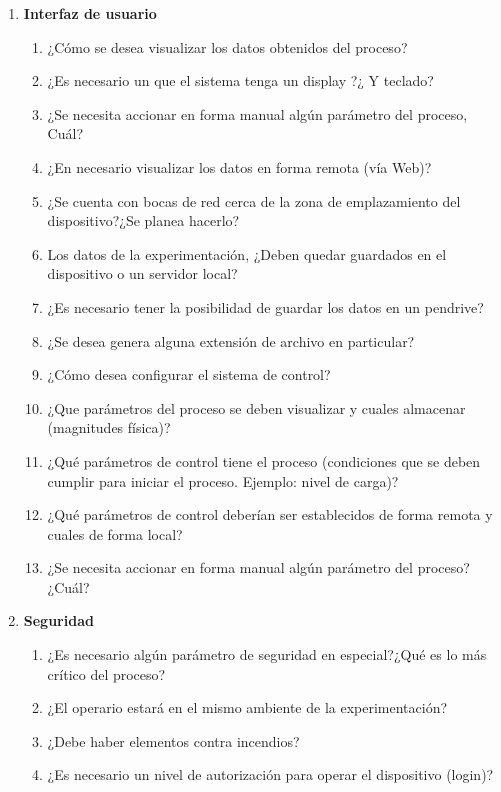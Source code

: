 \documentclass[12pt]{article}
\begin{document}
\begin{enumerate}
      \item \textbf{ Interfaz de usuario }
	\begin{enumerate}
	  \item ¿Cómo se desea visualizar los datos obtenidos del proceso?
	  \item ¿Es necesario un que el sistema tenga un display ?¿ Y teclado?
	  \item ¿Se necesita accionar en forma manual algún parámetro del proceso, Cuál?
	  \item ¿En necesario visualizar los datos en forma remota (vía Web)?
	  \item ¿Se cuenta con bocas de red cerca de la zona de emplazamiento del dispositivo?¿Se planea hacerlo?	  
	  \item Los datos de la experimentación, ¿Deben quedar guardados en el dispositivo o un servidor local?
	  \item ¿Es necesario tener la posibilidad de guardar los datos en un pendrive?	  
	  \item ¿Se desea genera alguna extensión de archivo en particular?
	  \item ¿Cómo desea configurar el sistema de control?
	  \item ¿Que parámetros del proceso se deben visualizar y cuales almacenar (magnitudes física)?
	  \item ¿Qué parámetros de control tiene el proceso (condiciones que se deben cumplir para iniciar el proceso. Ejemplo: nivel de carga)?
	  \item ¿Qué parámetros de control deberían ser establecidos de forma remota y cuales de forma local?
	  \item ¿Se necesita accionar en forma manual algún parámetro del proceso?¿Cuál?
	\end{enumerate}
      
      \item \textbf{ Seguridad }
	\begin{enumerate}
	  \item ¿Es necesario algún parámetro de seguridad en especial?¿Qué es lo más crítico del proceso?
	  \item ¿El operario estará en el mismo ambiente de la experimentación?
	  \item ¿Debe haber elementos contra incendios?
	  \item ¿Es necesario un nivel de autorización para operar el dispositivo (login)?
	\end{enumerate}
      
    \end{enumerate}
\end{document}
